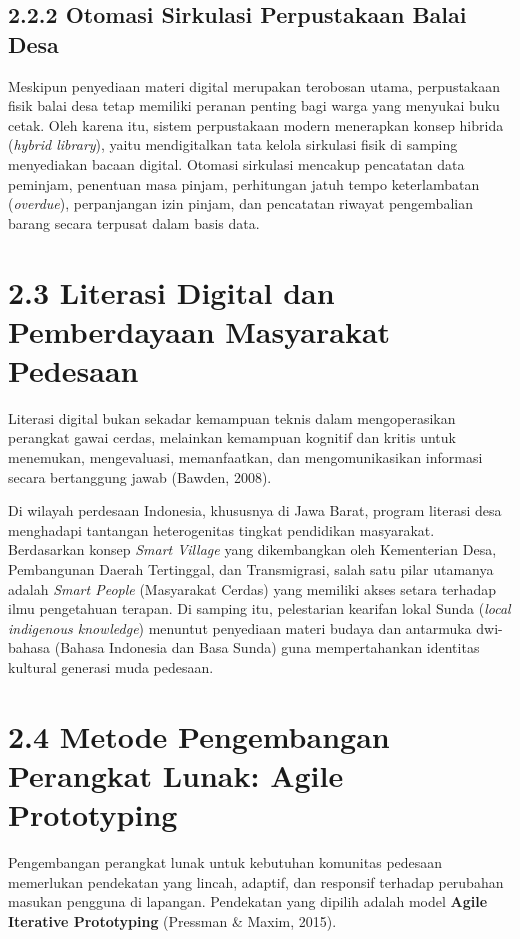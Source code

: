 \documentclass[
  indonesian,
  12pt,
]{report}
\begin{document}
\subsection{2.2.2 Otomasi Sirkulasi Perpustakaan Balai
Desa}\label{otomasi-sirkulasi-perpustakaan-balai-desa}

Meskipun penyediaan materi digital merupakan terobosan utama,
perpustakaan fisik balai desa tetap memiliki peranan penting bagi warga
yang menyukai buku cetak. Oleh karena itu, sistem perpustakaan modern
menerapkan konsep hibrida (\emph{hybrid library}), yaitu mendigitalkan
tata kelola sirkulasi fisik di samping menyediakan bacaan digital.
Otomasi sirkulasi mencakup pencatatan data peminjam, penentuan masa
pinjam, perhitungan jatuh tempo keterlambatan (\emph{overdue}),
perpanjangan izin pinjam, dan pencatatan riwayat pengembalian barang
secara terpusat dalam basis data.

\section{2.3 Literasi Digital dan Pemberdayaan Masyarakat
Pedesaan}\label{literasi-digital-dan-pemberdayaan-masyarakat-pedesaan}

Literasi digital bukan sekadar kemampuan teknis dalam mengoperasikan
perangkat gawai cerdas, melainkan kemampuan kognitif dan kritis untuk
menemukan, mengevaluasi, memanfaatkan, dan mengomunikasikan informasi
secara bertanggung jawab (Bawden, 2008).

Di wilayah perdesaan Indonesia, khususnya di Jawa Barat, program
literasi desa menghadapi tantangan heterogenitas tingkat pendidikan
masyarakat. Berdasarkan konsep \emph{Smart Village} yang dikembangkan
oleh Kementerian Desa, Pembangunan Daerah Tertinggal, dan Transmigrasi,
salah satu pilar utamanya adalah \emph{Smart People} (Masyarakat Cerdas)
yang memiliki akses setara terhadap ilmu pengetahuan terapan. Di samping
itu, pelestarian kearifan lokal Sunda (\emph{local indigenous
knowledge}) menuntut penyediaan materi budaya dan antarmuka dwi-bahasa
(Bahasa Indonesia dan Basa Sunda) guna mempertahankan identitas kultural
generasi muda pedesaan.

\section{2.4 Metode Pengembangan Perangkat Lunak: Agile
Prototyping}\label{metode-pengembangan-perangkat-lunak-agile-prototyping}

Pengembangan perangkat lunak untuk kebutuhan komunitas pedesaan
memerlukan pendekatan yang lincah, adaptif, dan responsif terhadap
perubahan masukan pengguna di lapangan. Pendekatan yang dipilih adalah
model \textbf{Agile Iterative Prototyping} (Pressman \& Maxim, 2015).
\end{document}
